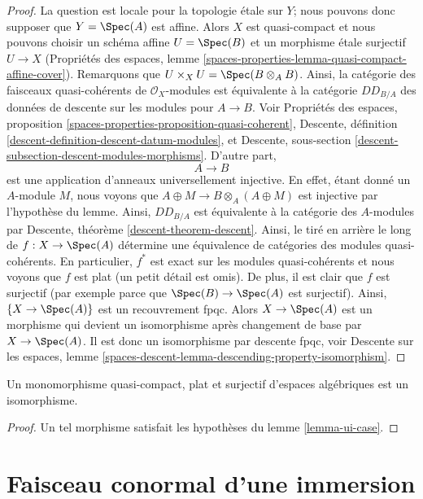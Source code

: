 \begin{proof}
La question est locale pour la topologie \'etale sur $Y$; nous pouvons donc supposer que $Y = \Spec(A)$
est affine. Alors $X$ est quasi-compact et nous pouvons choisir un schéma affine
$U = \Spec(B)$ et un morphisme \'etale surjectif $U \to X$
(Propriétés des espaces, lemme
\ref{spaces-properties-lemma-quasi-compact-affine-cover}).
Remarquons que $U \times_X U = \Spec(B \otimes_A B)$. Ainsi, la catégorie des
faisceaux quasi-cohérents de $\mathcal{O}_X$-modules est équivalente à la
catégorie $DD_{B/A}$ des données de descente sur les modules pour $A \to B$.
Voir Propriétés des espaces, proposition
\ref{spaces-properties-proposition-quasi-coherent},
Descente, définition \ref{descent-definition-descent-datum-modules}, et
Descente, sous-section \ref{descent-subsection-descent-modules-morphisms}.
D'autre part,
$$
A \to B
$$
est une application d'anneaux universellement injective. En effet, étant donné un
$A$-module $M$, nous voyons que $A \oplus M \to B \otimes_A (A \oplus M)$
est injective par l'hypothèse du lemme. Ainsi,
$DD_{B/A}$ est équivalente à la catégorie des $A$-modules par
Descente, théorème \ref{descent-theorem-descent}. Ainsi, le tiré en arrière le long de
$f : X \to \Spec(A)$ détermine une équivalence de catégories des
modules quasi-cohérents. En particulier, $f^*$ est exact sur les
modules quasi-cohérents et nous voyons que $f$ est plat
(un petit détail est omis). De plus, il est clair que $f$ est surjectif
(par exemple parce que $\Spec(B) \to \Spec(A)$ est surjectif).
Ainsi, $\{X \to \Spec(A)\}$ est un recouvrement fpqc.
Alors $X \to \Spec(A)$ est un morphisme qui devient un isomorphisme
après changement de base par $X \to \Spec(A)$. Il est donc un isomorphisme par
descente fpqc, voir Descente sur les espaces, lemme
\ref{spaces-descent-lemma-descending-property-isomorphism}.
\end{proof}

\begin{lemma}
\label{lemma-flat-surjective-monomorphism}
Un monomorphisme quasi-compact, plat et surjectif d'espaces algébriques
est un isomorphisme.
\end{lemma}

\begin{proof}
Un tel morphisme satisfait les hypothèses du lemme \ref{lemma-ui-case}.
\end{proof}







\section{Faisceau conormal d'une immersion}
\label{section-conormal-sheaf}

